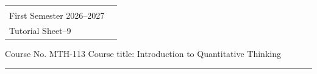 \documentclass[a4paper,leqno,12pt]{amsart}
\begin{document}
\hspace*{1.9cm}%
\begin{tabular}{@{}p{}p{}@{}}
 {\raggedright
   \begin{center} 
   \textbf{AZIM PREMJI UNIVERSITY, BHOPAL}\\
   First Semester 2026--2027 \\
   Tutorial Sheet--9
   \end{center}
  } %
\end{tabular}

\noindent Course No. MTH-113 \hfill  Course title: Introduction to Quantitative Thinking
\vspace{.3cm}
\hrule 
\vspace{.3cm}
\end{document}
